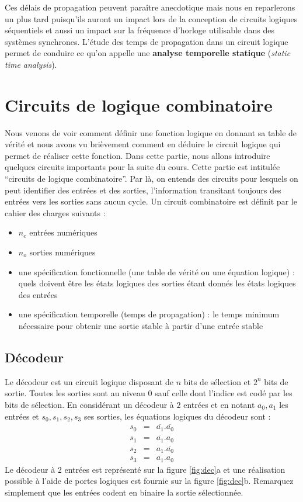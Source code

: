 Ces délais de propagation peuvent paraître anecdotique mais nous en reparlerons un plus tard puisqu'ils auront un impact lors de la conception de circuits logiques séquentiels et aussi un impact sur la fréquence d'horloge utilisable dans des systèmes synchrones. L'étude des temps de propagation dans un circuit logique permet de conduire ce qu'on appelle une \textbf{analyse temporelle statique} (\emph{static time analysis}).

\section{Circuits de logique combinatoire}

Nous venons de voir comment définir une fonction logique en donnant sa table de vérité et nous avons vu brièvement comment en déduire le circuit logique qui permet de réaliser cette fonction. Dans cette partie, nous allons introduire quelques circuits importants pour la suite du cours. Cette partie est intitulée ``circuits de logique combinatoire''. Par là, on entends des circuits pour lesquels on peut identifier des entrées et des sorties, l'information transitant toujours des entrées vers les sorties sans aucun cycle. Un circuit combinatoire est définit par le cahier des charges suivants :
\begin{itemize}
\item $n_e$ entrées numériques 
\item $n_o$ sorties numériques
\item une spécification fonctionnelle (une table de vérité ou une équation logique) : quels doivent être les états logiques des sorties étant donnés les états logiques des entrées
\item une spécification temporelle (temps de propagation) : le temps minimum nécessaire pour obtenir une sortie stable à partir d'une entrée stable
\end{itemize}

\subsection{Décodeur}

Le décodeur est un circuit logique disposant de $n$ bits de sélection et $2^n$ bits de sortie. Toutes les sorties sont au niveau $0$ sauf celle dont l'indice est codé par les bits de sélection. En considérant un décodeur à $2$ entrées et en notant $a_0, a_1$ les entrées et $s_0, s_1, s_2, s_3$ ses sorties, les équations logiques du décodeur sont :
\begin{eqnarray*}
s_0 &=& \overline{a_1}.\overline{a_0}\\
s_1 &=&\overline{a_1}.a_0\\
s_2 &=& a_1.\overline{a_0}\\
s_3 &=& a_1. a_0
\end{eqnarray*}
Le décodeur à 2 entrées est représenté sur la figure \ref{fig:dec}a et une réalisation possible à l'aide de portes logiques est fournie sur la figure \ref{fig:dec}b. Remarquez simplement que les entrées codent en binaire la sortie sélectionnée.


